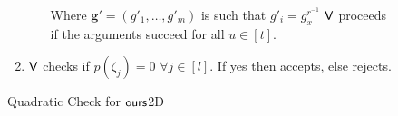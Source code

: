 \begin{figure}[h!]
\begin{framed}
\begin{enumerate}
\begin{itemize}
		Where $\bm{g}'= (g'_1, \ldots, g'_m)$ is such that $g'_i = g_x^{r^{-1}}$ 
		$\mathsf{V}$ proceeds if the arguments succeed for all $u \in [t]$.
	\end{itemize} 
		
	\item $\mathsf{V}$ checks if $p(\zeta_j)=0$ $\forall j\in[l]$. If yes then accepts, else rejects.
\end{enumerate}
\end{framed}
\caption{Quadratic Check for $\textsf{ours}$2D}
\end{figure}


